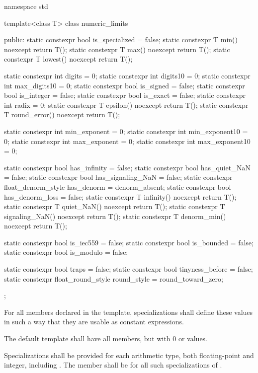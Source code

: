 %
\begin{codeblock}
namespace std {
  template<class T> class numeric_limits {
  public:
    static constexpr bool is_specialized = false;
    static constexpr T min() noexcept { return T(); }
    static constexpr T max() noexcept { return T(); }
    static constexpr T lowest() noexcept { return T(); }

    static constexpr int  digits = 0;
    static constexpr int  digits10 = 0;
    static constexpr int  max_digits10 = 0;
    static constexpr bool is_signed = false;
    static constexpr bool is_integer = false;
    static constexpr bool is_exact = false;
    static constexpr int  radix = 0;
    static constexpr T epsilon() noexcept { return T(); }
    static constexpr T round_error() noexcept { return T(); }

    static constexpr int  min_exponent = 0;
    static constexpr int  min_exponent10 = 0;
    static constexpr int  max_exponent = 0;
    static constexpr int  max_exponent10 = 0;

    static constexpr bool has_infinity = false;
    static constexpr bool has_quiet_NaN = false;
    static constexpr bool has_signaling_NaN = false;
    static constexpr float_denorm_style has_denorm = denorm_absent;
    static constexpr bool has_denorm_loss = false;
    static constexpr T infinity() noexcept { return T(); }
    static constexpr T quiet_NaN() noexcept { return T(); }
    static constexpr T signaling_NaN() noexcept { return T(); }
    static constexpr T denorm_min() noexcept { return T(); }

    static constexpr bool is_iec559 = false;
    static constexpr bool is_bounded = false;
    static constexpr bool is_modulo = false;

    static constexpr bool traps = false;
    static constexpr bool tinyness_before = false;
    static constexpr float_round_style round_style = round_toward_zero;
  };
}
\end{codeblock}

\pnum
For all members declared
 
in the
template, specializations shall define these values in such a way
that they are usable as
constant expressions.

\pnum
The default
template shall have all members, but with 0 or
values.

\pnum
Specializations shall be provided for each
arithmetic type,
both floating-point and integer, including
.
The member
shall be
for all such specializations of
.

